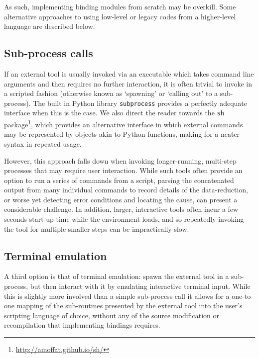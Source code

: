 \documentclass[5p,authoryear]{elsarticle}
\begin{document}
As such, implementing binding modules from scratch may be 
overkill.
Some alternative approaches to using low-level or legacy codes from a higher-level language are described below.

\subsection{Sub-process calls}
If an external tool is usually invoked via an executable which takes command line arguments and then requires no further interaction, it is often trivial to invoke in a scripted fashion (otherwise known as `spawning' or `calling out' to a sub-process). 
The built in Python library \texttt{subprocess} provides a perfectly adequate interface when this is the case. 
We also direct the reader towards the \texttt{sh} 
package\footnote{
\url{http://amoffat.github.io/sh/}
}, which 
provides an alternative interface in which external commands may be represented by objects akin to Python functions, making for a neater syntax in repeated usage.

However, this approach falls down when invoking longer-running, 
multi-step processes that may require user interaction. 
While such tools often provide an option
to run a series of commands from a script, parsing the concatenated output 
from many individual commands to record details of the data-reduction, 
or worse yet detecting error conditions and locating the cause, 
can present a considerable challenge. 
In addition, larger, interactive tools often incur a few seconds start-up
time while the environment loads, and so repeatedly invoking the tool for 
multiple smaller steps can be impractically slow. 

\subsection{Terminal emulation}
\label{sec:emulation}
A third option is that of terminal emulation: spawn the external tool in a 
sub-process, but then interact with it by emulating interactive terminal input.
While this is slightly more involved than a simple sub-process call it 
allows for a one-to-one mapping of the sub-routines presented by the external 
tool into the user's scripting language of choice, without any of the 
source modification or recompilation that implementing bindings requires. 
\end{document}

